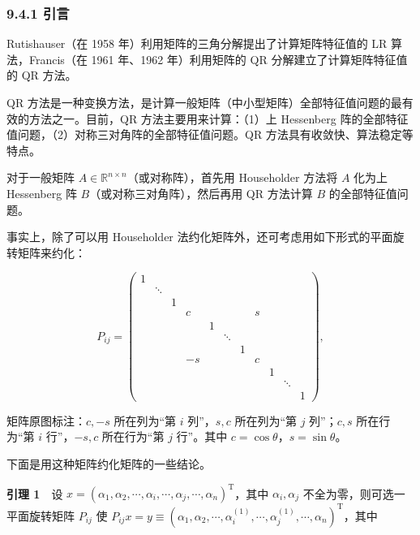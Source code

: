 \documentclass[
  10pt,
  fontset=fandol]{ctexart}
\begin{document}
\subsubsection{9.4.1 引言}\label{ux5f15ux8a00-2}

Rutishauser（在 1958 年）利用矩阵的三角分解提出了计算矩阵特征值的 LR 算法，Francis（在 1961 年、1962 年）利用矩阵的 QR 分解建立了计算矩阵特征值的 QR 方法。

QR 方法是一种变换方法，是计算一般矩阵（中小型矩阵）全部特征值问题的最有效的方法之一。目前，QR 方法主要用来计算：（1）上 Hessenberg 阵的全部特征值问题，（2）对称三对角阵的全部特征值问题。QR 方法具有收敛快、算法稳定等特点。

对于一般矩阵 \(A\in\mathbb R^{n\times n}\)（或对称阵），首先用 Householder 方法将 \(A\) 化为上 Hessenberg 阵 \(B\)（或对称三对角阵），然后再用 QR 方法计算 \(B\) 的全部特征值问题。

事实上，除了可以用 Householder 法约化矩阵外，还可考虑用如下形式的平面旋转矩阵来约化：

\[
P_{ij}=\left(\begin{array}{*{11}{c}}
1&&&&&&&&&&\\
&\ddots&&&&&&&&&\\
&&1&&&&&&&&\\
&&&c&&&&s&&&\\
&&&&1&&&&&&\\
&&&&&\ddots&&&&&\\
&&&&&&1&&&&\\
&&&-s&&&&c&&&\\
&&&&&&&&1&&\\
&&&&&&&&&\ddots&\\
&&&&&&&&&&1
\end{array}\right),
\tag{9.4.1}
\]

矩阵原图标注：\(c,-s\) 所在列为``第 \(i\) 列''，\(s,c\) 所在列为``第 \(j\) 列''；\(c,s\) 所在行为``第 \(i\) 行''，\(-s,c\) 所在行为``第 \(j\) 行''。其中 \(c=\cos\theta\)，\(s=\sin\theta\)。

下面是用这种矩阵约化矩阵的一些结论。

\textbf{引理 1}　设 \(x=(\alpha_1,\allowbreak \alpha_2,\allowbreak \cdots,\allowbreak \alpha_i,\allowbreak \cdots,\allowbreak \alpha_j,\allowbreak \cdots,\allowbreak \alpha_n)^{\mathrm T}\)，其中 \(\alpha_i,\alpha_j\) 不全为零，则可选一平面旋转矩阵 \(P_{ij}\) 使 \(P_{ij}x=y\equiv(\alpha_1,\allowbreak \alpha_2,\allowbreak \cdots,\allowbreak \alpha_i^{(1)},\allowbreak \cdots,\allowbreak \alpha_j^{(1)},\allowbreak \cdots,\allowbreak \alpha_n)^{\mathrm T}\)，其中
\end{document}
